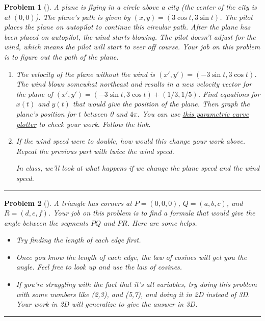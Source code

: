 \documentclass[letterpaper,oneside]{book}%
\theoremstyle{plain}
\theoremstyle{box}
\theoremstyle{problem}
\newtheorem{problemnum}{Problem}[chapter]
\newenvironment{problem}[1][]{\begin{problemnum}[#1]}{\end{problemnum}\nopagebreak\hrule\bigskip}
\begin{document}
\begin{problem}
A plane is flying in a circle above a city (the center of the city is at $(0,0)$).  The plane's path is given by $(x,y) = (3\cos t, 3\sin t)$.  The pilot places the plane on autopilot to continue this circular path. After the plane has been placed on autopilot, the wind starts blowing. The pilot doesn't adjust for the wind, which means the pilot will start to veer off course.  Your job on this problem is to figure out the path of the plane.
\begin{enumerate}
 \item The velocity of the plane without the wind is $(x',y') = (-3\sin t, 3\cos t)$.  The wind blows somewhat northeast and results in a new velocity vector for the plane of $(x',y') = (-3\sin t, 3\cos t)+(1/3, 1/5)$. Find equations for $x(t)$ and $y(t)$ that would give the position of the plane. Then graph the plane's position for $t$ between 0 and $4\pi$. You can use \href{http://bmw.byuimath.com/dokuwiki/doku.php?id=parametric_curve_plotter}{this parametric curve plotter} to check your work. Follow the link.
 \item If the wind speed were to double, how would this change your work above.  Repeat the previous part with twice the wind speed.
 
In class, we'll look at what happens if we change the plane speed and the wind speed.
\end{enumerate}

\end{problem}



\begin{problem}
 A triangle has corners at $P=(0,0,0)$, $Q=(a,b,c)$, and $R=(d,e,f)$. Your job on this problem is to find a formula that would give the angle between the segments $PQ$ and $PR$.  Here are some helps.  
\begin{itemize}
 \item Try finding the length of each edge first.
\item Once you know the length of each edge, the law of cosines will get you the angle.  Feel free to look up and use the law of cosines.
 \item If you're struggling with the fact that it's all variables, try doing this problem with some numbers like (2,3), and (5,7), and doing it in 2D instead of 3D. Your work in 2D will generalize to give the answer in 3D.    
\end{itemize}


\end{problem}
\end{document}

